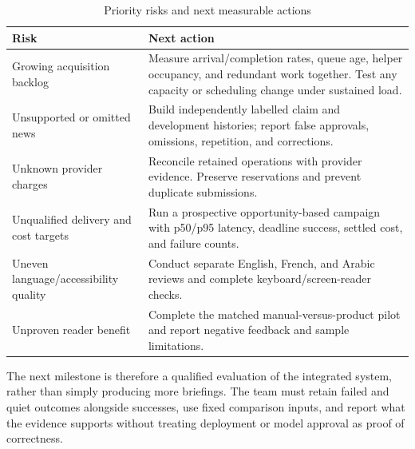\begin{table}[htbp]
\centering\small
\renewcommand{\arraystretch}{1.07}
\caption{Priority risks and next measurable actions}\label{tab:risks}
\begin{tabularx}{\linewidth}{L{3.2cm}X}
\toprule Risk & Next action \\ \midrule
Growing acquisition backlog & Measure arrival/completion rates, queue age, helper occupancy, and redundant work together. Test any capacity or scheduling change under sustained load. \\
Unsupported or omitted news & Build independently labelled claim and development histories; report false approvals, omissions, repetition, and corrections. \\
Unknown provider charges & Reconcile retained operations with provider evidence. Preserve reservations and prevent duplicate submissions. \\
Unqualified delivery and cost targets & Run a prospective opportunity-based campaign with p50/p95 latency, deadline success, settled cost, and failure counts. \\
Uneven language/accessibility quality & Conduct separate English, French, and Arabic reviews and complete keyboard/screen-reader checks. \\
Unproven reader benefit & Complete the matched manual-versus-product pilot and report negative feedback and sample limitations. \\
\bottomrule
\end{tabularx}
\end{table}

The next milestone is therefore a qualified evaluation of the integrated system, rather than simply producing more briefings. The team must retain failed and quiet outcomes alongside successes, use fixed comparison inputs, and report what the evidence supports without treating deployment or model approval as proof of correctness.